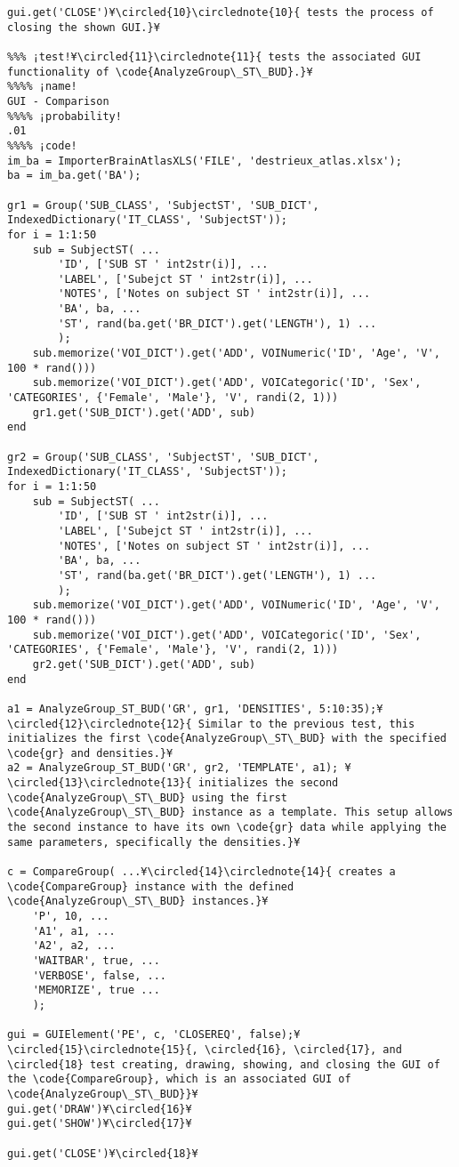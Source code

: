 \documentclass{tufte-handout}
\begin{document}
\begin{lstlisting}
gui.get('CLOSE')¥\circled{10}\circlednote{10}{ tests the process of closing the shown GUI.}¥

%%% ¡test!¥\circled{11}\circlednote{11}{ tests the associated GUI functionality of \code{AnalyzeGroup\_ST\_BUD}.}¥
%%%% ¡name!
GUI - Comparison
%%%% ¡probability!
.01
%%%% ¡code!
im_ba = ImporterBrainAtlasXLS('FILE', 'destrieux_atlas.xlsx');
ba = im_ba.get('BA');

gr1 = Group('SUB_CLASS', 'SubjectST', 'SUB_DICT', IndexedDictionary('IT_CLASS', 'SubjectST'));
for i = 1:1:50
    sub = SubjectST( ...
        'ID', ['SUB ST ' int2str(i)], ...
        'LABEL', ['Subejct ST ' int2str(i)], ...
        'NOTES', ['Notes on subject ST ' int2str(i)], ...
        'BA', ba, ...
        'ST', rand(ba.get('BR_DICT').get('LENGTH'), 1) ...
        );
    sub.memorize('VOI_DICT').get('ADD', VOINumeric('ID', 'Age', 'V', 100 * rand()))
    sub.memorize('VOI_DICT').get('ADD', VOICategoric('ID', 'Sex', 'CATEGORIES', {'Female', 'Male'}, 'V', randi(2, 1)))
    gr1.get('SUB_DICT').get('ADD', sub)
end

gr2 = Group('SUB_CLASS', 'SubjectST', 'SUB_DICT', IndexedDictionary('IT_CLASS', 'SubjectST'));
for i = 1:1:50
    sub = SubjectST( ...
        'ID', ['SUB ST ' int2str(i)], ...
        'LABEL', ['Subejct ST ' int2str(i)], ...
        'NOTES', ['Notes on subject ST ' int2str(i)], ...
        'BA', ba, ...
        'ST', rand(ba.get('BR_DICT').get('LENGTH'), 1) ...
        );
    sub.memorize('VOI_DICT').get('ADD', VOINumeric('ID', 'Age', 'V', 100 * rand()))
    sub.memorize('VOI_DICT').get('ADD', VOICategoric('ID', 'Sex', 'CATEGORIES', {'Female', 'Male'}, 'V', randi(2, 1)))
    gr2.get('SUB_DICT').get('ADD', sub)
end

a1 = AnalyzeGroup_ST_BUD('GR', gr1, 'DENSITIES', 5:10:35);¥\circled{12}\circlednote{12}{ Similar to the previous test, this initializes the first \code{AnalyzeGroup\_ST\_BUD} with the specified \code{gr} and densities.}¥
a2 = AnalyzeGroup_ST_BUD('GR', gr2, 'TEMPLATE', a1); ¥\circled{13}\circlednote{13}{ initializes the second \code{AnalyzeGroup\_ST\_BUD} using the first \code{AnalyzeGroup\_ST\_BUD} instance as a template. This setup allows the second instance to have its own \code{gr} data while applying the same parameters, specifically the densities.}¥

c = CompareGroup( ...¥\circled{14}\circlednote{14}{ creates a \code{CompareGroup} instance with the defined \code{AnalyzeGroup\_ST\_BUD} instances.}¥
    'P', 10, ...
    'A1', a1, ...
    'A2', a2, ...
    'WAITBAR', true, ...
    'VERBOSE', false, ...
    'MEMORIZE', true ...
    );

gui = GUIElement('PE', c, 'CLOSEREQ', false);¥\circled{15}\circlednote{15}{, \circled{16}, \circled{17}, and \circled{18} test creating, drawing, showing, and closing the GUI of the \code{CompareGroup}, which is an associated GUI of \code{AnalyzeGroup\_ST\_BUD}}¥
gui.get('DRAW')¥\circled{16}¥
gui.get('SHOW')¥\circled{17}¥

gui.get('CLOSE')¥\circled{18}¥

\end{lstlisting}
\end{document}
